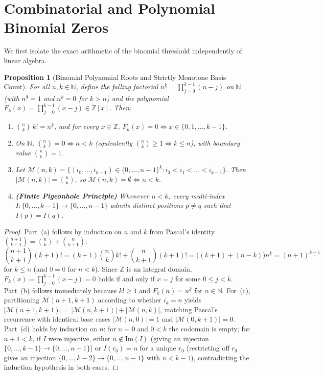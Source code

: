 \documentclass[11pt,a4paper]{article}
\newtheorem{proposition}[theorem]{Proposition}
\theoremstyle{definition}
\theoremstyle{remark}
\newcommand{\im}{\mathrm{Im}}
\newcommand{\Z}{\mathbb{Z}}
\newcommand{\N}{\mathbb{N}}
\begin{document}
\section{Combinatorial and Polynomial Binomial Zeros}

We first isolate the exact arithmetic of the binomial threshold independently of linear algebra.

\begin{proposition}[Binomial Polynomial Roots and Strictly Monotone Basis Count]\label{prop:binomial-zeros}
For all $n, k \in \N$, define the falling factorial $n^{\underline{k}} = \prod_{j=0}^{k-1}(n - j)$ on $\N$ (with $n^{\underline{0}} = 1$ and $n^{\underline{k}} = 0$ for $k > n$) and the polynomial $F_k(x) = \prod_{j=0}^{k-1}(x - j) \in \Z[x]$. Then:
\begin{enumerate}
\item[(a)] $\binom{n}{k}\,k! = n^{\underline{k}}$, and for every $x \in \Z$, $F_k(x) = 0 \iff x \in \{0, 1, \dots, k-1\}$.
\item[(b)] On $\N$, $\binom{n}{k} = 0 \iff n < k$ (equivalently $\binom{n}{k} \ge 1 \iff k \le n$), with boundary value $\binom{n}{n} = 1$.
\item[(c)] Let $\mathcal{M}(n, k) = \{(i_0, \dots, i_{k-1}) \in \{0, \dots, n-1\}^k : i_0 < i_1 < \dots < i_{k-1}\}$. Then $|\mathcal{M}(n, k)| = \binom{n}{k}$, so $\mathcal{M}(n, k) = \emptyset \iff n < k$.
\item[(d)] \textbf{(Finite Pigeonhole Principle)} Whenever $n < k$, every multi-index $I : \{0, \dots, k-1\} \to \{0, \dots, n-1\}$ admits distinct positions $p \neq q$ such that $I(p) = I(q)$.
\end{enumerate}
\end{proposition}

\begin{proof}
Part~(a) follows by induction on $n$ and $k$ from Pascal's identity $\binom{n+1}{k+1} = \binom{n}{k} + \binom{n}{k+1}$:
\[
  \binom{n+1}{k+1}(k+1)! = (k+1)\binom{n}{k}k! + \binom{n}{k+1}(k+1)! = \bigl((k+1) + (n - k)\bigr) n^{\underline{k}} = (n+1)^{\underline{k+1}}
\]
for $k \le n$ (and $0 = 0$ for $n < k$). Since $\Z$ is an integral domain, $F_k(x) = \prod_{j=0}^{k-1}(x-j) = 0$ holds if and only if $x = j$ for some $0 \le j < k$. Part~(b) follows immediately because $k! \ge 1$ and $F_k(n) = n^{\underline{k}}$ for $n \in \N$. For~(c), partitioning $\mathcal{M}(n+1, k+1)$ according to whether $i_k = n$ yields $|\mathcal{M}(n+1, k+1)| = |\mathcal{M}(n, k+1)| + |\mathcal{M}(n, k)|$, matching Pascal's recurrence with identical base cases $|\mathcal{M}(n, 0)| = 1$ and $|\mathcal{M}(0, k+1)| = 0$. Part~(d) holds by induction on $n$: for $n = 0$ and $0 < k$ the codomain is empty; for $n+1 < k$, if $I$ were injective, either $n \notin \im(I)$ (giving an injection $\{0,\dots,k-1\} \to \{0,\dots,n-1\}$) or $I(r_0) = n$ for a unique $r_0$ (restricting off $r_0$ gives an injection $\{0,\dots,k-2\} \to \{0,\dots,n-1\}$ with $n < k-1$), contradicting the induction hypothesis in both cases.
\end{proof}
\end{document}
